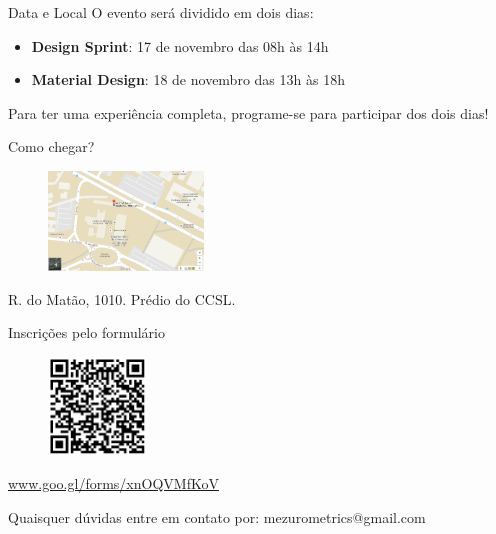 \documentclass[final]{beamer} %
\begin{document}
\begin{frame}{}
\begin{centering}
\begin{minipage}[t][13em][t]{.3\textwidth}
\begin{block}{\centering \large Data e Local}
        O evento será dividido em dois dias:

        \begin{itemize}
          \item \textbf{Design Sprint}: 17 de novembro das 08h às 14h
            \vfill
          \item \textbf{Material Design}: 18 de novembro das 13h às 18h
        \end{itemize}

        \vspace{.4em}
        Para ter uma experiência completa, programe-se para participar dos dois dias!
      \end{block}%
    \end{minipage}\hfill%
    \begin{minipage}[t][13em][t]{.3\textwidth}
      \center
      \begin{block}{\centering \large Como chegar?}
        \center
        \begin{figure}[h]
          \includegraphics[height=100px]{ccsl-location}
        \end{figure}
        R. do Matão, 1010. Prédio do CCSL.
      \end{block}%
    \end{minipage}\hfill%
    \begin{minipage}[t][13em][t]{.3\textwidth}
      \begin{block}{\centering \large Inscrições pelo formulário}
        \center
        \begin{figure}[h]
          \includegraphics[height=99px]{design_sprint_form_qr}
        \end{figure}
        \url{www.goo.gl/forms/xnOQVMfKoV}
      \end{block}
    \end{minipage}

    \vfill
    {\large Quaisquer dúvidas entre em contato por: mezurometrics@gmail.com}
  \end{centering}
\end{frame}
\end{document}
